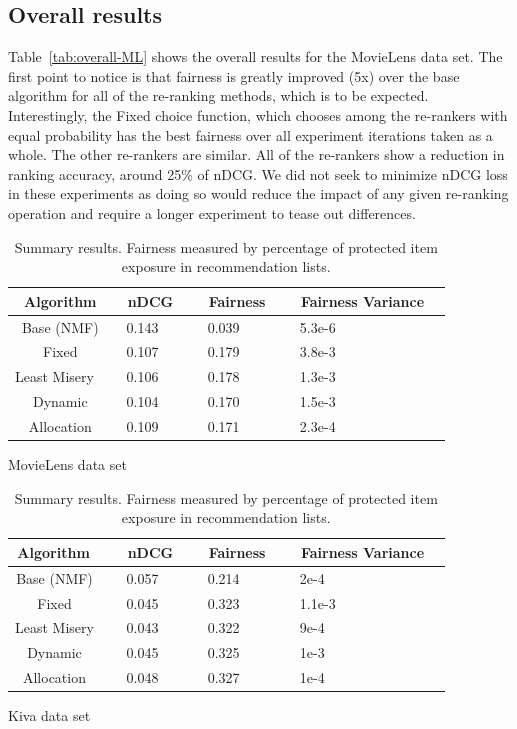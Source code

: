 \subsection{Overall results}

Table~\ref{tab:overall-ML} shows the overall results for the MovieLens data set. The first point to notice is that fairness is greatly improved (5x) over the base algorithm for all of the re-ranking methods, which is to be expected. Interestingly, the Fixed choice function, which chooses among the re-rankers with equal probability has the best fairness over all experiment iterations taken as a whole. The other re-rankers are similar. All of the re-rankers show a reduction in ranking accuracy, around 25\% of nDCG. We did not seek to minimize nDCG loss in these experiments as doing so would reduce the impact of any given re-ranking operation and require a longer experiment to tease out differences.

\begin{table}[htb]
\setlength\tabcolsep{0pt}
    \begin{subtable}{.5\textwidth}
    \centering
    \begin{tabular}{c|l|l|l}
       Algorithm  & \ nDCG \ & \ Fairness \  & \ Fairness Variance \ \\
       \hline
       Base (NMF)       & \ 0.143 & \ 0.039 & \ 5.3e-6 \  \\
       Fixed            & \ 0.107 & \ 0.179 & \ 3.8e-3 \ \\
       Least Misery \   & \ 0.106 & \ 0.178 & \ 1.3e-3 \ \\
       Dynamic          & \ 0.104 & \ 0.170 & \ 1.5e-3 \ \\
       Allocation       & \ 0.109 & \ 0.171 & \ 2.3e-4 \ \\
    \end{tabular}
    \caption{MovieLens data set}
    \label{tab:overall-ML}
 \end{subtable}%
   \begin{subtable}{.5\textwidth}
    \centering
    \begin{tabular}{c|l|l|l}
       Algorithm  \ & \ nDCG \ & \ Fairness \ & \ Fairness Variance \ \\
       \hline
       Base (NMF)   \ & \ 0.057 & \ 0.214 & \ 2e-4\\
       Fixed        \ & \ 0.045 & \ 0.323 & \ 1.1e-3\\
       Least Misery \ & \ 0.043 & \ 0.322 & \ 9e-4\\
       Dynamic      \ & \ 0.045 & \ 0.325 & \ 1e-3\\
       Allocation   \ & \ 0.048 & \ 0.327 & \ 1e-4\\
    \end{tabular}
    \caption{Kiva data set}
    \label{tab:overall-Kiva}
    \end{subtable}
    \caption{Summary results. Fairness measured by percentage of protected item exposure in recommendation lists.}
\end{table}

